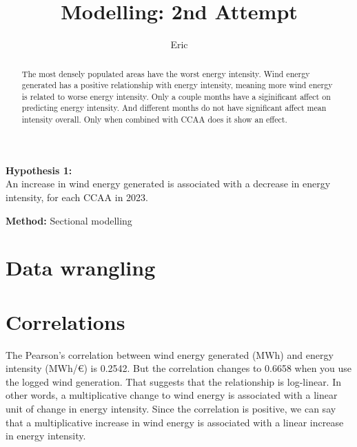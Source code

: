 \documentclass[
]{report}
\title{Modelling: 2nd Attempt}
\author{Eric}
\date{}
\renewcommand*\contentsname{Table of contents}
\newcommand\contentsname{Table of contents}
\begin{document}
\maketitle
\begin{abstract}
The most densely populated areas have the worst energy intensity. Wind
energy generated has a positive relationship with energy intensity,
meaning more wind energy is related to worse energy intensity. Only a
couple months have a siginificant affect on predicting energy intensity.
And different months do not have significant affect mean intensity
overall. Only when combined with CCAA does it show an effect.
\end{abstract}
\ifdefined\Shaded\renewenvironment{Shaded}{\begin{tcolorbox}[enhanced, boxrule=0pt, interior hidden, frame hidden, borderline west={3pt}{0pt}{shadecolor}, breakable, sharp corners]}{\end{tcolorbox}}\fi

\renewcommand*\contentsname{Table of contents}
{
\hypersetup{linkcolor=}
\setcounter{tocdepth}{2}
\tableofcontents
}
\newpage

\textbf{Hypothesis 1:}\\
An increase in wind energy generated is associated with a decrease in
energy intensity, for each CCAA in 2023.

\textbf{Method:} Sectional modelling

\hypertarget{data-wrangling}{%
\section{Data wrangling}\label{data-wrangling}}

\hypertarget{correlations}{%
\section{Correlations}\label{correlations}}

The Pearson's correlation between wind energy generated (MWh) and energy
intensity (MWh/€) is 0.2542. But the correlation changes to 0.6658 when
you use the logged wind generation. That suggests that the relationship
is log-linear. In other words, a multiplicative change to wind energy is
associated with a linear unit of change in energy intensity. Since the
correlation is positive, we can say that a multiplicative increase in
wind energy is associated with a linear increase in energy intensity.
\end{document}
